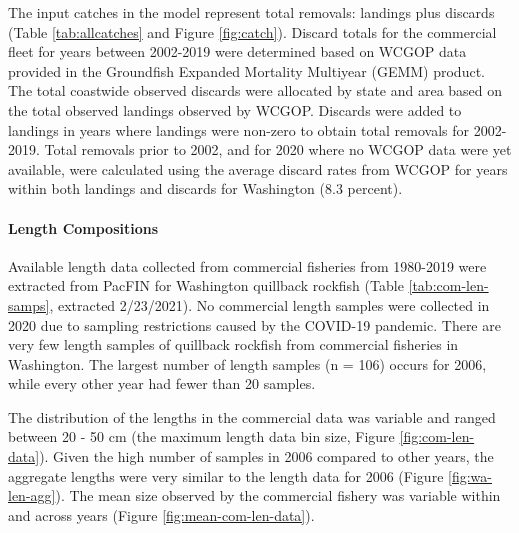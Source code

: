 \documentclass[11pt,
  english,
  letterpaper,
]{article}
\begin{document}
\leavevmode\tagmcend\tagstructend\par


The input catches in the model represent total removals: landings plus discards (Table \ref{tab:allcatches} and Figure \ref{fig:catch}). Discard totals for the commercial fleet for years between 2002-2019 were determined based on WCGOP data provided in the Groundfish Expanded Mortality Multiyear (GEMM) product. The total coastwide observed discards were allocated by state and area based on the total observed landings observed by WCGOP. Discards were added to landings in years where landings were non-zero to obtain total removals for 2002-2019. Total removals prior to 2002, and for 2020 where no WCGOP data were yet available, were calculated using the average discard rates from WCGOP for years within both landings and discards for Washington (8.3 percent).

\leavevmode\tagmcend\tagstructend\par


\hypertarget{length-compositions}{%
\paragraph{Length Compositions}\label{length-compositions}}

\leavevmode\tagmcend\tagstructend


Available length data collected from commercial fisheries from 1980-2019 were extracted from PacFIN for Washington quillback rockfish (Table \ref{tab:com-len-samps}, extracted 2/23/2021). No commercial length samples were collected in 2020 due to sampling restrictions caused by the COVID-19 pandemic. There are very few length samples of quillback rockfish from commercial fisheries in Washington. The largest number of length samples (n = 106) occurs for 2006, while every other year had fewer than 20 samples.

\leavevmode\tagmcend\tagstructend\par


The distribution of the lengths in the commercial data was variable and ranged between 20 - 50 cm (the maximum length data bin size, Figure \ref{fig:com-len-data}). Given the high number of samples in 2006 compared to other years, the aggregate lengths were very similar to the length data for 2006 (Figure \ref{fig:wa-len-agg}). The mean size observed by the commercial fishery was variable within and across years (Figure \ref{fig:mean-com-len-data}).
\end{document}
